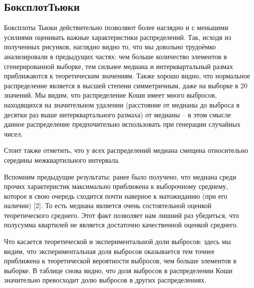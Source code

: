 \subsection{БоксплотТьюки}

Боксплоты Тьюки действительно позволяют более наглядно и с меньшими усилиями оценивать важные характеристики распределений. Так, исходя из полученных рисунков, наглядно видно то, что мы довольно трудоёмко анализировали в предыдущих частях: чем больше количество элементов в сгенерированной выборке, тем сильнее медиана и интерквартальный размах приближаются к теоретическим значениям. Также хорошо видно, что нормальное распределение является в высшей степени симметричным, даже на выборке в 20 значений. Мы видим, что распределение Коши имеет много выбросов, находящихся на значительном удалении (расстояние от медианы до выброса в десятки раз выше интерквартального размаха) от медианы -- в этом смысле данное распределение предпочительно использовать при генерации случайных чисел.

Стоит также отметить, что у всех распределений медиана смещена относительно середины межквартильного интервала. 

Вспомним предыдущие результаты: ранее было получено, что медиана среди прочих характеристик максимально приближена к выборочному среднему, которое в свою очередь сходится почти наверное к матожиданию (при его наличии) [2]. То есть медиана является очень состоятельной оценкой теоретического среднего. Этот факт позволяет нам лишний раз убедиться, что полусумма квартилей не является достаточно качественной оценкой среднего.

Что касается теоретической и экспериментальной доли выбросов: здесь мы видим, что экспериментальная доля выбросов оказывается тем точнее приближена к теоретической вероятности выбросов, чем больше элементов в выборке. В таблице снова видно, что доля выбросов в распределении Коши значительно превосходит долю выбросов в других распределениях.
